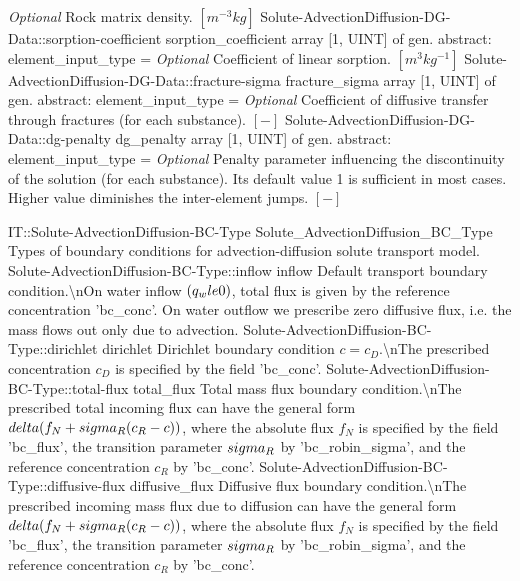 \begin{RecordType}
			{ \it{Optional}}
			{{{Rock matrix density. }{$[m^{-3}kg]$}%
}}
		\RecKey
			{Solute-AdvectionDiffusion-DG-Data::sorption-coefficient}
			{sorption{\_}coefficient}
			{{array [1, UINT] of }{gen. abstract: }}{{element{\_}input{\_}type}{ = }}
			{ \it{Optional}}
			{{{Coefficient of linear sorption. }{$[m^{3}kg^{-1}]$}%
}}
		\RecKey
			{Solute-AdvectionDiffusion-DG-Data::fracture-sigma}
			{fracture{\_}sigma}
			{{array [1, UINT] of }{gen. abstract: }}{{element{\_}input{\_}type}{ = }}
			{ \it{Optional}}
			{{{Coefficient of diffusive transfer through fractures (for each substance). }{$[-]$}%
}}
		\RecKey
			{Solute-AdvectionDiffusion-DG-Data::dg-penalty}
			{dg{\_}penalty}
			{{array [1, UINT] of }{gen. abstract: }}{{element{\_}input{\_}type}{ = }}
			{ \it{Optional}}
			{{{Penalty parameter influencing the discontinuity of the solution (for each substance). Its default value 1 is sufficient in most cases.
Higher value diminishes the inter-element jumps. }{$[-]$}%
}}
\end{RecordType}
\begin{SelectionType}
	{IT::Solute-AdvectionDiffusion-BC-Type}
	{Solute{\_}AdvectionDiffusion{\_}BC{\_}Type}
	{{{Types of boundary conditions for advection-diffusion solute transport model.}%
}}
		\SelectionItem
			{Solute-AdvectionDiffusion-BC-Type::inflow}
			{inflow}
			{{{Default transport boundary condition.{\textbackslash}nOn water inflow }{$(q_w \\le 0)$}{, total flux is given by the reference concentration 'bc{\_}conc'. On water outflow we prescribe zero diffusive flux, i.e. the mass flows out only due to advection.}%
}}
		\SelectionItem
			{Solute-AdvectionDiffusion-BC-Type::dirichlet}
			{dirichlet}
			{{{Dirichlet boundary condition }{$ c = c_D $}{.{\textbackslash}nThe prescribed concentration }{$c_D$}{ is specified by the field 'bc{\_}conc'.}%
}}
		\SelectionItem
			{Solute-AdvectionDiffusion-BC-Type::total-flux}
			{total{\_}flux}
			{{{Total mass flux boundary condition.{\textbackslash}nThe prescribed total incoming flux can have the general form }{$\\delta(f_N+\\sigma_R(c_R-c) )$}{, where the absolute flux }{$f_N$}{ is specified by the field 'bc{\_}flux', the transition parameter }{$\\sigma_R$}{ by 'bc{\_}robin{\_}sigma', and the reference concentration }{$c_R$}{ by 'bc{\_}conc'.}%
}}
		\SelectionItem
			{Solute-AdvectionDiffusion-BC-Type::diffusive-flux}
			{diffusive{\_}flux}
			{{{Diffusive flux boundary condition.{\textbackslash}nThe prescribed incoming mass flux due to diffusion can have the general form }{$\\delta(f_N+\\sigma_R(c_R-c) )$}{, where the absolute flux }{$f_N$}{ is specified by the field 'bc{\_}flux', the transition parameter }{$\\sigma_R$}{ by 'bc{\_}robin{\_}sigma', and the reference concentration }{$c_R$}{ by 'bc{\_}conc'.}%
}}
\end{SelectionType}
